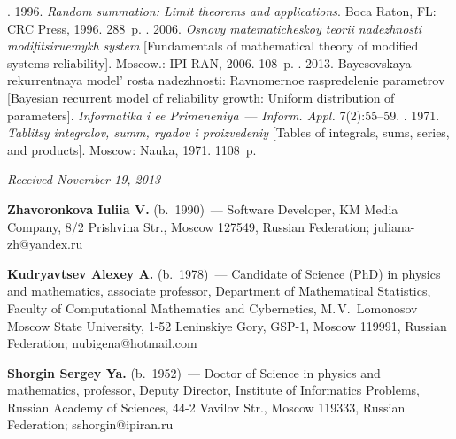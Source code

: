 \pagebreak


  \begin{multicols}{2}

\renewcommand{\bibname}{\protect\rmfamily References}

{\small\frenchspacing
{%
\begin{thebibliography}{9}

.
1996. \textit{Random summation: Limit theorems and applications}.
Boca Raton, FL: CRC Press, 1996. 288~p.
.
2006. \textit{Osnovy matemati\-che\-skoy teorii nadezhnosti modifitsiruemykh system}
[Fundamentals of mathematical theory of modified systems reliability].
Moscow.: IPI RAN, 2006. 108~p.
.
2013. Bayesovskaya rekurrentnaya model' rosta nadezhnosti:
Ravnomernoe raspredelenie parametrov
[Bayesian recurrent model of reliability growth:
Uniform distribution of parameters].
\textit{Informatika i ee Primeneniya}~--- \textit{Inform. Appl.} 7(2):55--59.
.
1971. \textit{Tablitsy integralov, summ, ryadov i proizvedeniy}
[Tables of integrals, sums, series, and products]. Moscow: Nauka, 1971. 1108~p.

\end{thebibliography}
} }


\end{multicols}

\vspace*{-6pt}

\hfill{\small\textit{Received November 19, 2013}}

\vspace*{-18pt}


\Contr

\noindent
\textbf{Zhavoronkova Iuliia V.} (b.\ 1990)~---
Software Developer, KM Media Company, 8/2 Prishvina Str., Moscow 127549,
Russian Federation; juliana-zh@yandex.ru

\vspace*{3pt}

\noindent
\textbf{Kudryavtsev Alexey A.} (b.\ 1978)~---
Candidate of Science (PhD) in physics and mathematics, associate professor,
Department of Mathematical Statistics, Faculty of Computational Mathematics and
Cybernetics, M.\,V.~Lomonosov Moscow State University,
1-52 Leninskiye Gory, GSP-1, Moscow 119991, Russian Federation;\linebreak
 nubigena@hotmail.com

\vspace*{3pt}

\noindent
\textbf{Shorgin Sergey Ya.} (b.\ 1952)~---
Doctor of Science in physics and mathematics, professor, Deputy Director,
Institute of Informatics Problems, Russian Academy of Sciences,
44-2 Vavilov Str., Moscow 119333, Russian Federation;  sshorgin@ipiran.ru

 \label{end\stat}

\renewcommand{\bibname}{\protect\rm Литература}

